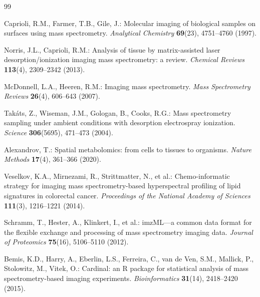 \documentclass[11pt,twoside,openright]{book}
\begin{document}

\begin{thebibliography}{99}
\small

Caprioli, R.M., Farmer, T.B., Gile, J.: Molecular imaging of biological samples on surfaces using mass spectrometry.
\textit{Analytical Chemistry} \textbf{69}(23), 4751--4760 (1997).

Norris, J.L., Caprioli, R.M.: Analysis of tissue by matrix-assisted laser desorption/ionization imaging mass spectrometry: a review.
\textit{Chemical Reviews} \textbf{113}(4), 2309--2342 (2013).

McDonnell, L.A., Heeren, R.M.: Imaging mass spectrometry.
\textit{Mass Spectrometry Reviews} \textbf{26}(4), 606--643 (2007).

Tak{\'a}ts, Z., Wiseman, J.M., Gologan, B., Cooks, R.G.: Mass spectrometry sampling under ambient conditions with desorption electrospray ionization.
\textit{Science} \textbf{306}(5695), 471--473 (2004).

Alexandrov, T.: Spatial metabolomics: from cells to tissues to organisms.
\textit{Nature Methods} \textbf{17}(4), 361--366 (2020).

Veselkov, K.A., Mirnezami, R., Strittmatter, N., et al.: Chemo-informatic strategy for imaging mass spectrometry-based hyperspectral profiling of lipid signatures in colorectal cancer.
\textit{Proceedings of the National Academy of Sciences} \textbf{111}(3), 1216--1221 (2014).

Schramm, T., Hester, A., Klinkert, I., et al.: imzML---a common data format for the flexible exchange and processing of mass spectrometry imaging data.
\textit{Journal of Proteomics} \textbf{75}(16), 5106--5110 (2012).

Bemis, K.D., Harry, A., Eberlin, L.S., Ferreira, C., van de Ven, S.M., Mallick, P., Stolowitz, M., Vitek, O.: Cardinal: an R package for statistical analysis of mass spectrometry-based imaging experiments.
\textit{Bioinformatics} \textbf{31}(14), 2418--2420 (2015).


\end{thebibliography}
\end{document}
